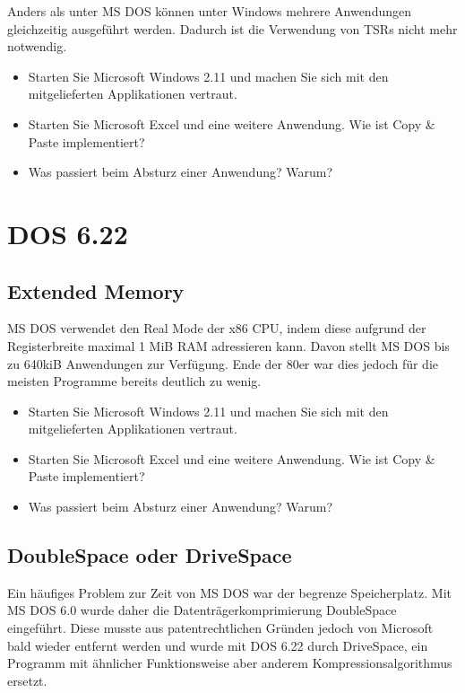 	Anders als unter MS DOS können unter Windows mehrere Anwendungen gleichzeitig ausgeführt werden. 
	Dadurch ist die Verwendung von TSRs nicht mehr notwendig.

	\begin{itemize}
		\item Starten Sie Microsoft Windows 2.11 und machen Sie sich mit den mitgelieferten Applikationen vertraut.
		\item Starten Sie Microsoft Excel und eine weitere Anwendung. Wie ist Copy \& Paste implementiert?
		\item Was passiert beim Absturz einer Anwendung? Warum?
	\end{itemize}


\section{DOS 6.22}

	\subsection{Extended Memory}

	MS DOS verwendet den Real Mode der x86 CPU, indem diese aufgrund der Registerbreite maximal 1 MiB RAM adressieren kann. Davon stellt MS DOS bis zu 640kiB Anwendungen zur Verfügung. Ende der 80er war dies jedoch für die meisten Programme bereits deutlich zu wenig.

	\begin{itemize}
		\item Starten Sie Microsoft Windows 2.11 und machen Sie sich mit den mitgelieferten Applikationen vertraut.
		\item Starten Sie Microsoft Excel und eine weitere Anwendung. Wie ist Copy \& Paste implementiert?
		\item Was passiert beim Absturz einer Anwendung? Warum?
	\end{itemize}

	\subsection{DoubleSpace oder DriveSpace}

	Ein häufiges Problem zur Zeit von MS DOS war der begrenze Speicherplatz. Mit MS DOS 6.0 wurde daher die Datenträgerkomprimierung DoubleSpace eingeführt.
	Diese musste aus patentrechtlichen Gründen jedoch von Microsoft bald wieder entfernt werden und wurde mit DOS 6.22 durch DriveSpace, ein Programm mit ähnlicher Funktionsweise aber anderem Kompressionsalgorithmus ersetzt.

